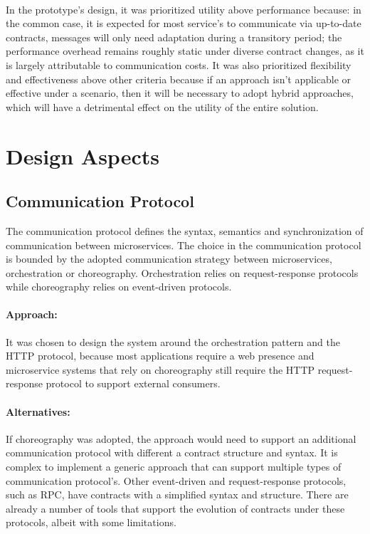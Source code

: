 \paragraph{}

In the prototype's design, it was prioritized utility above performance because:
in the common case, it is expected for most service's to communicate via up-to-date contracts, messages will only need adaptation during a transitory period;
the performance overhead remains roughly static under diverse contract changes, as it is largely attributable to communication costs.
It was also prioritized flexibility and effectiveness above other criteria because if an approach isn't applicable or effective under a scenario,
then it will be necessary to adopt hybrid approaches, which will have a detrimental effect on the utility of the entire solution.

\section{Design Aspects} %
\label{sec:design_aspects}

\subsection{Communication Protocol} %
\label{sec:communication_protocol}

The communication protocol defines the syntax, semantics and synchronization of communication between microservices.
The choice in the communication protocol is bounded by the adopted communication strategy between microservices, orchestration or choreography.
Orchestration relies on request-response protocols while choreography relies on event-driven protocols.

\paragraph{Approach:}
It was chosen to design the system around the orchestration pattern and the HTTP protocol,
because most applications require a web presence and microservice systems that
rely on choreography still require the HTTP request-response protocol to support external consumers.

\paragraph{Alternatives:}
If choreography was adopted, the approach would need to support an additional communication protocol with different a contract structure and syntax.
It is complex to implement a generic approach that can support multiple types of communication protocol's.
Other event-driven and request-response protocols, such as RPC, have contracts with a simplified
syntax and structure.
There are already a number of tools that support the evolution of contracts under these protocols, albeit with some limitations.


